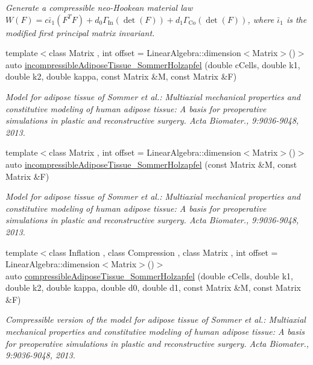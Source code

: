 \begin{DoxyCompactItemize}
\begin{DoxyCompactList}\small\item\em Generate a compressible neo-\/\-Hookean material law $ W(F)=c\bar\iota_1(F^T F)+d_0\Gamma_\mathrm{In}(\det(F))+d_1\Gamma_\mathrm{Co}(\det(F)) $, where $\bar\iota_1$ is the modified first principal matrix invariant. \end{DoxyCompactList}\item 
{\footnotesize template$<$class Matrix , int offset = Linear\-Algebra\-::dimension$<$\-Matrix$>$()$>$ }\\auto \hyperlink{group__Biomechanics_ga8ae9c0e3e217b82ca8020e716faac738}{incompressible\-Adipose\-Tissue\-\_\-\-Sommer\-Holzapfel} (double c\-Cells, double k1, double k2, double kappa, const Matrix \&M, const Matrix \&F)
\begin{DoxyCompactList}\small\item\em Model for adipose tissue of Sommer et al.\-: Multiaxial mechanical properties and constitutive modeling of human adipose tissue\-: A basis for preoperative simulations in plastic and reconstructive surgery. Acta Biomater., 9\-:9036-\/9048, 2013. \end{DoxyCompactList}\item 
{\footnotesize template$<$class Matrix , int offset = Linear\-Algebra\-::dimension$<$\-Matrix$>$()$>$ }\\auto \hyperlink{group__Biomechanics_gaf78d6e032c8bd9b5ea67ac4329ef61d2}{incompressible\-Adipose\-Tissue\-\_\-\-Sommer\-Holzapfel} (const Matrix \&M, const Matrix \&F)
\begin{DoxyCompactList}\small\item\em Model for adipose tissue of Sommer et al.\-: Multiaxial mechanical properties and constitutive modeling of human adipose tissue\-: A basis for preoperative simulations in plastic and reconstructive surgery. Acta Biomater., 9\-:9036-\/9048, 2013. \end{DoxyCompactList}\item 
{\footnotesize template$<$class Inflation , class Compression , class Matrix , int offset = Linear\-Algebra\-::dimension$<$\-Matrix$>$()$>$ }\\auto \hyperlink{group__Biomechanics_ga4c4a1bc765b6deb392a8151f02deaea8}{compressible\-Adipose\-Tissue\-\_\-\-Sommer\-Holzapfel} (double c\-Cells, double k1, double k2, double kappa, double d0, double d1, const Matrix \&M, const Matrix \&F)
\begin{DoxyCompactList}\small\item\em Compressible version of the model for adipose tissue of Sommer et al.\-: Multiaxial mechanical properties and constitutive modeling of human adipose tissue\-: A basis for preoperative simulations in plastic and reconstructive surgery. Acta Biomater., 9\-:9036-\/9048, 2013. \end{DoxyCompactList}\item 

\end{DoxyCompactItemize}
